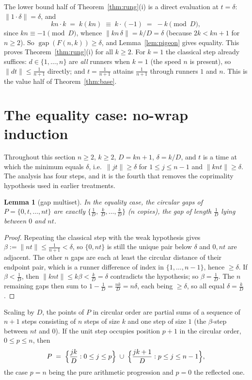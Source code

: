 \documentclass[11pt,a4paper]{article}
\theoremstyle{plain}
\newtheorem{lemma}[theorem]{Lemma}
\theoremstyle{definition}
\theoremstyle{remark}
\newcommand{\norm}[1]{\lVert #1 \rVert}
\newcommand{\gap}{\operatorname{gap}}
\begin{document}
The lower bound half of Theorem~\ref{thm:rung}(i) is a direct evaluation at
$t = \delta$: $\norm{1 \cdot \delta} = \delta$, and
\[
  kn \cdot k \;=\; k(kn) \;\equiv\; k \cdot (-1) \;=\; -k \pmod{D},
\]
since $kn \equiv -1 \pmod{D}$, whence $\norm{kn\,\delta} = k/D = \delta$
(because $2k < kn+1$ for $n \ge 2$). So $\gap(F(n,k)) \ge \delta$, and
Lemma~\ref{lem:pigeon} gives equality. This proves
Theorem~\ref{thm:rung}(i) for all $k \ge 2$. For $k = 1$ the classical step
already suffices: $d \in \{1, \dots, n\}$ are \emph{all} runners when $k=1$
(the speed $n$ is present), so $\norm{dt} \le \tfrac1{n+1}$ directly; and
$t = \tfrac1{n+1}$ attains $\tfrac1{n+1}$ through runners $1$ and $n$. This
is the value half of Theorem~\ref{thm:base}.

\section{The equality case: no-wrap induction}\label{sec:equality}

Throughout this section $n \ge 2$, $k \ge 2$, $D = kn+1$, $\delta = k/D$,
and $t$ is a time at which the minimum equals $\delta$, i.e.\
$\norm{jt} \ge \delta$ for $1 \le j \le n-1$ and $\norm{knt} \ge \delta$.
The analysis has four steps, and it is the fourth that removes the
coprimality hypothesis used in earlier treatments.

\begin{lemma}[gap multiset]\label{lem:multiset}
In the equality case, the circular gaps of $P = \{0, t, \dots, nt\}$ are
exactly $\{\tfrac1D,\ \tfrac{k}{D}, \dots, \tfrac{k}{D}\}$ ($n$ copies), the
gap of length $\tfrac1D$ lying between $0$ and $nt$.
\end{lemma}

\begin{proof}
Repeating the classical step with the weak hypothesis gives
$\beta := \norm{nt} \le \tfrac1{n+1} < \delta$, so $\{0, nt\}$ is still the
unique pair below $\delta$ and $0, nt$ are adjacent. The other $n$ gaps are
each at least the circular distance of their endpoint pair, which is a
runner difference of index in $\{1, \dots, n-1\}$, hence $\ge \delta$. If
$\beta < \tfrac1D$, then $\norm{knt} \le k\beta < \tfrac{k}{D} = \delta$
contradicts the hypothesis; so $\beta = \tfrac1D$. The $n$ remaining gaps
then sum to $1 - \tfrac1D = \tfrac{nk}{D} = n\delta$, each being $\ge \delta$,
so all equal $\delta = \tfrac{k}{D}$.
\end{proof}

Scaling by $D$, the points of $P$ in circular order are partial sums of a
sequence of $n+1$ steps consisting of $n$ steps of size $k$ and one step of
size $1$ (the $\beta$-step between $nt$ and $0$). If the unit step occupies
position $p+1$ in the circular order, $0 \le p \le n$, then
\begin{equation}\label{eq:Ap}
  P \;=\; \Bigl\{ \frac{jk}{D} : 0 \le j \le p \Bigr\}
  \;\cup\;
  \Bigl\{ \frac{jk+1}{D} : p \le j \le n-1 \Bigr\},
\end{equation}
the case $p = n$ being the pure arithmetic progression and $p = 0$ the
reflected one.
\end{document}
